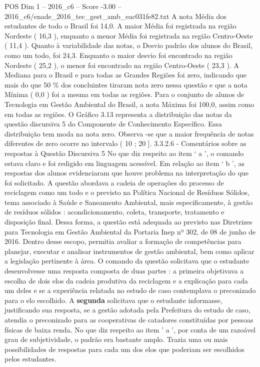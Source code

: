 \begin{textsample}{POS Dim 1 – 2016\_c6 – Score -3.00 – 2016\_c6/enade\_2016\_tec\_gest\_amb\_eac031fe82.txt}
A nota Média dos estudantes de todo o Brasil foi 14,0.
A maior Média foi registrada na região Nordeste ( 16,3 ), enquanto a menor Média foi registrada na região Centro-Oeste ( 11,4 ).
Quanto à variabilidade das notas, o Desvio padrão dos alunos do Brasil, como um todo, foi 24,3.
Enquanto o maior desvio foi encontrado na região Nordeste ( 25,2 ), o menor foi encontrado na região Centro-Oeste ( 23,3 ).
A Mediana para o Brasil e para todas as Grandes Regiões foi zero, indicando que mais do que 50 \% dos concluintes tiraram nota zero nessa questão e que a nota Mínima ( 0,0 ) foi a mesma em todas as regiões.
Para o conjunto de alunos de Tecnologia em Gestão Ambiental do Brasil, a nota Máxima foi 100,0, assim como em todas as regiões.
O Gráfico 3.13 representa a distribuição das notas da questão discursiva 5 do Componente de Conhecimento Específico.
Essa distribuição tem moda na nota zero.
Observa -se que a maior frequência de notas diferentes de zero ocorre no intervalo ( 10 ; 20 ]. 3.3.2.6 - Comentários sobre as respostas à Questão Discursiva 5 No que diz respeito ao item ‘ a ’, o comando estava claro e foi redigido em linguagem acessível.
Em relação ao item ‘ b ’, as respostas dos alunos evidenciaram que houve problema na interpretação do que foi solicitado.
A questão abordava a cadeia de operações do processo de reciclagem como um todo e o previsto na Política Nacional de Resíduos Sólidos, tema associado à Saúde e Saneamento Ambiental, mais especificamente, à gestão de resíduos sólidos : acondicionamento, coleta, transporte, tratamento e disposição final.
Dessa forma, a questão está adequada ao previsto nas Diretrizes para Tecnologia em Gestão Ambiental da Portaria Inep nº 302, de 08 de junho de 2016.
Dentro desse escopo, permitia avaliar a formação de competências para planejar, executar e analisar instrumentos de gestão ambiental, bem como aplicar a legislação pertinente à área.
O comando da questão solicitava que o estudante desenvolvesse uma resposta composta de duas partes : a primeira objetivava a escolha de dois elos da cadeia produtiva da reciclagem e a explicação para cada um deles e se a experiência relatada no estudo de caso contemplava o preconizado para o elo escolhido.
A \textbf{segunda} solicitava que o estudante informasse, justificando sua resposta, se a gestão adotada pela Prefeitura do estudo de caso, atendia o preconizado para as cooperativas de catadores constituídas por pessoas físicas de baixa renda.
No que diz respeito ao item ’ a ’, por conta de um razoável grau de subjetividade, o padrão era bastante amplo.
Trazia uma ou mais possibilidades de respostas para cada um dos elos que poderiam ser escolhidos pelos estudantes.

\end{textsample}
